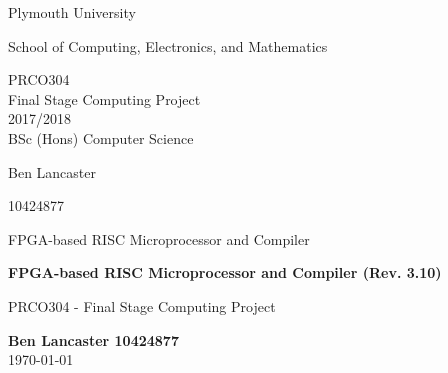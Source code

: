 \documentclass[11pt,a4paper]{report}
\newcommand{\dlatestv}{3.10}
\begin{document}

\listoftodos

\makeatletter
\DeclareRobustCommand*{\nameref}{%
\color{blue}%
        \@ifstar\T@nameref\T@nameref
        }%
\makeatother

\begin{titlepage}
\begin{center}
\vspace*{2cm}

\Huge
Plymouth University

\vspace{2cm}
\huge
School of Computing, Electronics, and Mathematics

\vspace{2cm}
\huge
PRCO304\\
Final Stage Computing Project\\
2017/2018\\

\vspace{1.5cm}
\huge
BSc (Hons) Computer Science


\Large
\vspace{1.5cm}
Ben Lancaster

\vspace{1cm}
10424877

\vspace{1cm}
FPGA-based RISC Microprocessor and Compiler




\end{center}
\end{titlepage}


\newpage
\begin{titlepage}
\begin{center}

\vspace*{5cm}
\Large

{\color{blue9d}
\textbf{
FPGA-based RISC Microprocessor and Compiler (Rev. \dlatestv{})
}
}

\vspace{0.4cm}
\large
PRCO304 - Final Stage Computing Project

\vspace{4cm}
\textbf{Ben Lancaster 10424877}\\
\today 


\end{center}

\end{titlepage}
\end{document}
